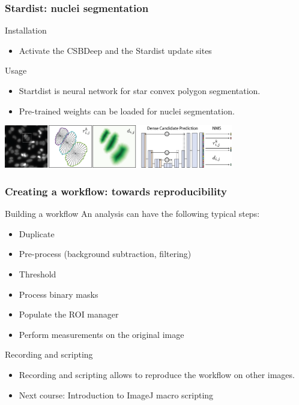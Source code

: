 \documentclass[ignorenonframetext,aspectratio=169,10pt,xcolor=table]{beamer}
\begin{document}
\begin{frame} \frametitle{Stardist: nuclei segmentation}

  \begin{block}{Installation}
    \begin{itemize}
    \item Activate the CSBDeep and the Stardist update sites
    \end{itemize}
  \end{block}
  \begin{block}{Usage}
    \begin{itemize}
    \item Startdist is neural network for star convex polygon segmentation.
    \item Pre-trained weights can be loaded for nuclei segmentation.
    \end{itemize}
    \begin{center}
      \includegraphics[width=0.75\textwidth]{stardist}
    \end{center}
  \end{block}

  \centering

\end{frame}

\begin{frame} \frametitle{Creating a workflow: towards reproducibility}

  \begin{block}{Building a workflow}
    An analysis can have the following typical steps:
    \begin{itemize}
      \item Duplicate
      \item Pre-process (background subtraction, filtering)
      \item Threshold
      \item Process binary masks
      \item Populate the ROI manager
      \item Perform measurements on the original image
    \end{itemize}
  \end{block}

  \begin{block}{Recording and scripting}
    \begin{itemize}
    \item Recording and scripting allows to reproduce the workflow on other images.
    \item \alert{Next course:} Introduction to ImageJ macro scripting
  \end{itemize}
  \end{block}

\end{frame}
\end{document}
